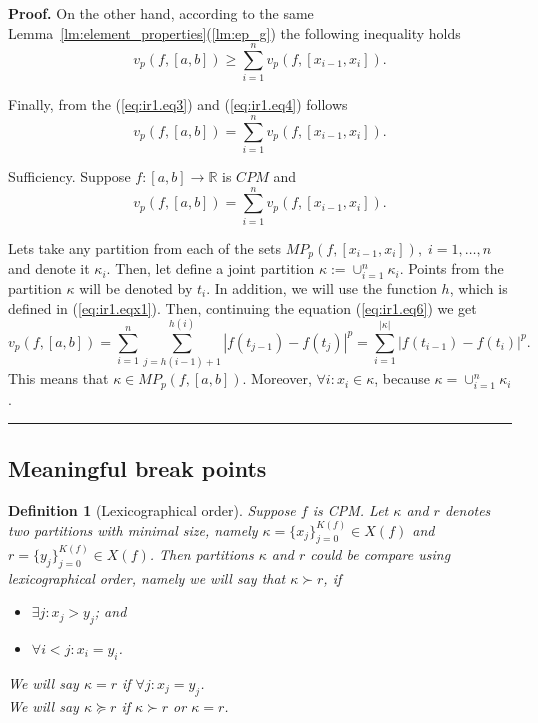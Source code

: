 \documentclass[12pt, a4paper]{article}
\newtheorem{definition}[theorem]{Definition}
\newenvironment{proof}[1][Proof]{\noindent \textbf{#1.} }{\  \rule{0.5em}{0.5em}}
\numberwithin{equation}{section}
\begin{document}
\begin{proof}
  On the other hand, according to the same Lemma~\ref{lm:element_properties}(\ref{lm:ep_g}) the following inequality holds
  \begin{equation}\label{eq:ir1.eq4}
    v_p(f,[a,b]) \geq \sum_{i=1}^n v_p(f,[x_{i-1},x_i]).
  \end{equation}
  
  Finally, from the (\ref{eq:ir1.eq3}) and (\ref{eq:ir1.eq4}) follows 
  \begin{equation}\label{eq:ir1.eq5}
    v_p(f,[a,b]) = \sum_{i=1}^n v_p(f,[x_{i-1},x_i]).
  \end{equation}
  
  Sufficiency. Suppose $f:[a,b] \rightarrow \mathbb{R}$ is $CPM$ and 
  \begin{equation}\label{eq:ir1.eq6}
    v_p(f,[a,b]) = \sum_{i=1}^n v_p(f,[x_{i-1},x_i]).
  \end{equation}
  
  Lets take any partition from each of the sets $MP_{p}(f,[x_{i-1},x_i]),\;i=1,\dots,n$ and denote it $\kappa_i$.
  Then, let define a joint partition $\kappa:=\cup_{i=1}^n \kappa_i$. 
  Points from the partition $\kappa$ will be denoted by $t_i$. 
  In addition, we will use the function $h$, which is defined in (\ref{eq:ir1.eqx1}).
  Then, continuing the equation (\ref{eq:ir1.eq6}) we get
  \begin{equation}\label{eq:ir1.eq7}
  v_p(f,[a,b]) = \sum_{i=1}^n\sum_{j=h(i-1)+1}^{h(i)}|f(t_{j-1})-f(t_j)|^p
    =\sum_{i=1}^{|\kappa|}|f(t_{i-1})-f(t_i)|^p.
  \end{equation}
  This means that $\kappa \in MP_{p}(f,[a,b])$. Moreover, $\forall i:x_i \in \kappa$,
  because $\kappa=\cup_{i=1}^n \kappa_i$.  
\end{proof}

\subsection{Meaningful break points}

\begin{definition}[Lexicographical order]\label{def:LexiOrder}
  Suppose $f$ is CPM. Let $\kappa$ and $r$ denotes two partitions with minimal size, namely
  $\kappa=\{x_j\}_{j=0}^{K(f)}\in X(f)$ 
  and $r=\{ y_j \}_{j=0}^{K(f)}\in X(f)$.
  Then partitions $\kappa$ and $r$ could be compare using \emph{lexicographical order}, namely
  we will say that $\kappa \succ r$, if 
  \begin{itemize}
    \item $\exists j: x_j > y_j$; and
    \item $\forall i<j: x_i = y_i$.
  \end{itemize} 
  We will say $\kappa = r$ if $\forall j:x_j=y_j$.\\
  We will say $\kappa \succeq r$ if $\kappa \succ r$ or $\kappa = r$.
\end{definition}
\end{document}
